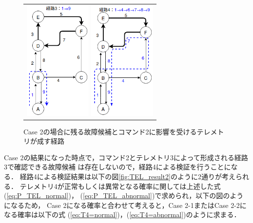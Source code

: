 \documentclass[11pt]{jsreport}
\begin{document}
\begin{figure}[H]
   \centering
      \begin{tabular}{c}
         \begin{minipage}{0.50\hsize}
         \centering
         \includegraphics[height=6cm]{figure/second_route_T3.png}
         \end{minipage}
         \begin{minipage}{0.50\hsize}
         \centering
         \includegraphics[height=6cm]{figure/second_route_T4.png}
         \end{minipage}
      \end{tabular}
      \caption{Case 2の場合に残る故障候補とコマンド2に影響を受けるテレメトリが成す経路}%
      \label{fig:sucond_route}  
\end{figure}

Case 2の結果になった時点で，コマンド2とテレメトリ3によって形成される経路3で確認できる故障候補
は存在しないので，経路4による検証を行うことになる．
経路4による検証結果は以下の図\ref{fig:TEL_result2}のように2通りが考えられる．
テレメトリ4が正常もしくは異常となる確率に関しては上述した式(\ref{eq:P_TEL_normal})，
(\ref{eq:P_TEL_abnormal})で求められ，以下の図のようになるため，
Case 2になる確率と合わせて考えると，Case 2-1またはCase 2-2になる確率は以下の式
(\ref{eq:T4=normal})，(\ref{eq:T4=abnormal})のように求まる．
\end{document}
